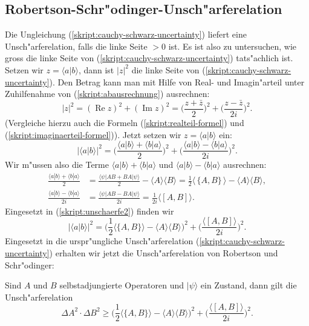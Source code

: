 \subsection{Robertson-Schr"odinger-Unsch"arferelation}
Die Ungleichung (\ref{skript:cauchy-schwarz-uncertainty}) liefert eine
Unsch"arferelation, falls die linke Seite $>0$ ist. Es ist
also zu untersuchen, wie gross die linke Seite von 
(\ref{skript:cauchy-schwarz-uncertainty}) tats"achlich ist.
Setzen wir $z=\langle a|b\rangle$, dann ist $|z|^2$ die linke Seite
von (\ref{skript:cauchy-schwarz-uncertainty}). Den Betrag kann man mit Hilfe
von Real- und Imagin"arteil unter Zuhilfenahme von (\ref{skript:abausrechnung})
ausrechnen:
\[
|z|^2
=
(\operatorname{Re}z)^2+(\operatorname{Im}z)^2
=
\biggl(\frac{z+\bar z}2\biggr)^2 + \biggl(\frac{z-\bar z}{2i}\biggr)^2.
\]
(Vergleiche hierzu auch die Formeln (\ref{skript:realteil-formel}) und 
(\ref{skript:imaginaerteil-formel})).
Jetzt setzen wir $z=\langle a|b\rangle$ ein:
\begin{equation}
|\langle a|b\rangle|^2
=
\biggl(\frac{\langle a|b\rangle + \langle b|a\rangle}2\biggr)^2
+
\biggl(\frac{\langle a|b\rangle - \langle b|a\rangle}{2i}\biggr)^2.
\label{skript:unschaerfe2}
\end{equation}
Wir m"ussen also die Terme $\langle a|b\rangle + \langle b|a\rangle$
und $\langle a|b\rangle - \langle b|a\rangle$ ausrechnen:
\begin{align*}
\frac{\langle a|b\rangle + \langle b|a\rangle}2
&=
\frac{
\langle\psi|AB+BA|\psi\rangle 
}2
-\langle A\rangle\langle B\rangle
=
\frac12 \langle\,\{A,B\}\,\rangle - \langle A\rangle\langle B\rangle,
\\
\frac{\langle a|b\rangle - \langle b|a\rangle}{2i}
&=
\frac{\langle\psi|AB-BA|\psi\rangle}{2i}
=
\frac1{2i}\langle [A,B]\rangle.
\end{align*}
Eingesetzt in (\ref{skript:unschaerfe2}) finden wir
\[
|\langle a|b\rangle|^2
=
\biggl(
\frac12\langle \{A,B\}\rangle - \langle A\rangle\langle B\rangle
\biggr)^2
+
\biggl(
\frac{\langle[A,B]\rangle}{2i}
\biggr)^2.
\]
Eingesetzt in die urspr"ungliche Unsch"arferelation
(\ref{skript:cauchy-schwarz-uncertainty}) erhalten wir jetzt die Unsch"arferelation
von Robertson und Schr"odinger:

\begin{satz}
\label{skript:robertson-schroedinger-unschaerfe}
Sind $A$ und $B$ selbstadjungierte Operatoren und $|\psi\rangle$ ein
Zustand, dann gilt die Unsch"arferelation
\begin{equation}
\Delta A^2\cdot\Delta B^2\ge 
\biggl(
\frac12\langle \{A,B\}\rangle - \langle A\rangle\langle B\rangle
\biggr)^2
+
\biggl(
\frac{\langle[A,B]\rangle}{2i}
\biggr)^2.
\label{skript:uncertainty}
\end{equation}
\end{satz}


